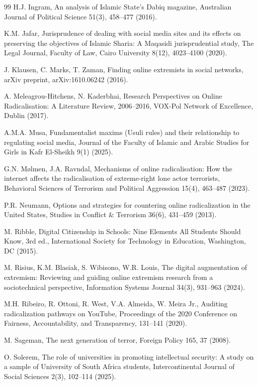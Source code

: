 \documentclass[10pt]{NSP1}
\begin{document}
\begin{thebibliography}{99}
H.J. Ingram, An analysis of Islamic State's Dabiq magazine, Australian Journal of Political Science 51(3), 458–477 (2016).

K.M. Jafar, Jurisprudence of dealing with social media sites and its effects on preserving the objectives of Islamic Sharia: A Maqasidi jurisprudential study, The Legal Journal, Faculty of Law, Cairo University 8(12), 4023–4100 (2020).

J. Klausen, C. Marks, T. Zaman, Finding online extremists in social networks, arXiv preprint, arXiv:1610.06242 (2016).

A. Meleagrou-Hitchens, N. Kaderbhai, Research Perspectives on Online Radicalisation: A Literature Review, 2006–2016, VOX-Pol Network of Excellence, Dublin (2017).

A.M.A. Musa, Fundamentalist maxims (Usuli rules) and their relationship to regulating social media, Journal of the Faculty of Islamic and Arabic Studies for Girls in Kafr El-Sheikh 9(1) (2025).

G.N. Mølmen, J.A. Ravndal, Mechanisms of online radicalisation: How the internet affects the radicalisation of extreme-right lone actor terrorists, Behavioral Sciences of Terrorism and Political Aggression 15(4), 463–487 (2023).

P.R. Neumann, Options and strategies for countering online radicalization in the United States, Studies in Conflict \& Terrorism 36(6), 431–459 (2013).

M. Ribble, Digital Citizenship in Schools: Nine Elements All Students Should Know, 3rd ed., International Society for Technology in Education, Washington, DC (2015).

M. Risius, K.M. Blasiak, S. Wibisono, W.R. Louis, The digital augmentation of extremism: Reviewing and guiding online extremism research from a sociotechnical perspective, Information Systems Journal 34(3), 931–963 (2024).

M.H. Ribeiro, R. Ottoni, R. West, V.A. Almeida, W. Meira Jr., Auditing radicalization pathways on YouTube, Proceedings of the 2020 Conference on Fairness, Accountability, and Transparency, 131–141 (2020).

M. Sageman, The next generation of terror, Foreign Policy 165, 37 (2008).

O. Solerem, The role of universities in promoting intellectual security: A study on a sample of University of South Africa students, Intercontinental Journal of Social Sciences 2(3), 102–114 (2025).


\end{thebibliography}
\end{document}
